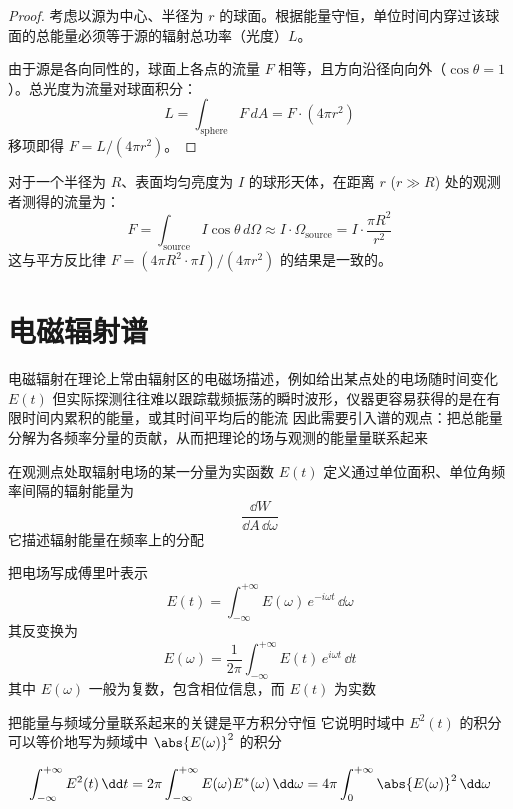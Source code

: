 \begin{proof}
    考虑以源为中心、半径为 $r$ 的球面。根据能量守恒，单位时间内穿过该球面的总能量必须等于源的辐射总功率（光度）$L$。
    
    由于源是各向同性的，球面上各点的流量 $F$ 相等，且方向沿径向向外（$\cos\theta = 1$）。总光度为流量对球面积分：
    \begin{equation}
        L = \int_{\text{sphere}} F \, dA = F \cdot (4\pi r^2)
    \end{equation}
    移项即得 $F = L / (4\pi r^2)$。
\end{proof}
对于一个半径为 $R$、表面均匀亮度为 $I$ 的球形天体，在距离 $r$ ($r \gg R$) 处的观测者测得的流量为：
\begin{equation}
    F = \int_{\text{source}} I \cos\theta \, d\Omega \approx I \cdot \Omega_{\text{source}} = I \cdot \frac{\pi R^2}{r^2}
\end{equation}
这与平方反比律 $F = (4\pi R^2 \cdot \pi I) / (4\pi r^2)$ 的结果是一致的。

\section{电磁辐射谱}


电磁辐射在理论上常由辐射区的电磁场描述，例如给出某点处的电场随时间变化 $E(t)$  
但实际探测往往难以跟踪载频振荡的瞬时波形，仪器更容易获得的是在有限时间内累积的能量，或其时间平均后的能流  
因此需要引入谱的观点：把总能量分解为各频率分量的贡献，从而把理论的场与观测的能量量联系起来

\begin{definition}[谱能量密度]
在观测点处取辐射电场的某一分量为实函数 $E(t)$  
定义通过单位面积、单位角频率间隔的辐射能量为
\[
\frac{\dd W}{\dd A\,\dd\omega}
\]
它描述辐射能量在频率上的分配
\end{definition}

把电场写成傅里叶表示
\[
E(t)=\int_{-\infty}^{+\infty}E(\omega)\,e^{-i\omega t}\,\dd\omega
\]
其反变换为
\[
E(\omega)=\frac{1}{2\pi}\int_{-\infty}^{+\infty}E(t)\,e^{i\omega t}\,\dd t
\]
其中 $E(\omega)$ 一般为复数，包含相位信息，而 $E(t)$ 为实数

把能量与频域分量联系起来的关键是平方积分守恒  
它说明时域中 $E^2(t)$ 的积分可以等价地写为频域中 $\abs{E(\omega)}^2$ 的积分

\begin{equation}
\int_{-\infty}^{+\infty}E^2(t)\,\dd t
=2\pi\int_{-\infty}^{+\infty}E(\omega)E^*(\omega)\,\dd\omega
=4\pi\int_{0}^{+\infty}\abs{E(\omega)}^2\,\dd\omega
\end{equation}


